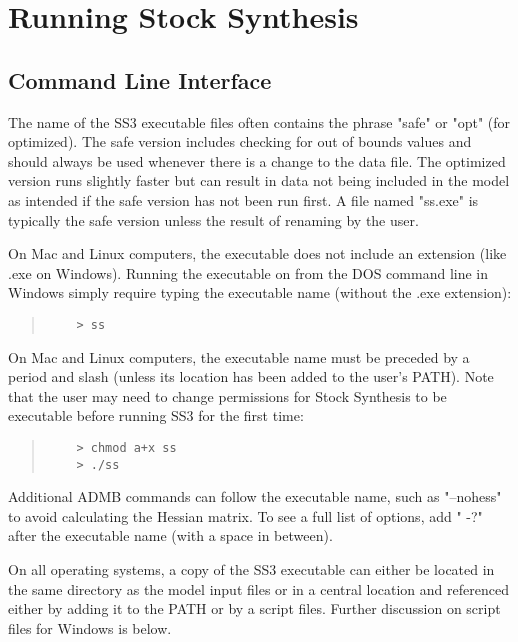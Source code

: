\section{Running Stock Synthesis} \label{sec:RunningSS}

\subsection{Command Line Interface}
The name of the SS3 executable files often contains the phrase "safe" or "opt" (for optimized). The safe version includes checking for out of bounds values and should always be used whenever there is a change to the data file. The optimized version runs slightly faster but can result in data not being included in the model as intended if the safe version has not been run first. A file named "ss.exe" is typically the safe version unless the result of renaming by the user.

On Mac and Linux computers, the executable does not include an extension (like .exe on Windows).
Running the executable on from the DOS command line in Windows simply require typing the executable name (without the .exe extension):
\begin{quote}
	\begin{verbatim}
	> ss
	\end{verbatim}
\end{quote}


On Mac and Linux computers, the executable name must be preceded by a period and slash (unless its location has been added to the user's PATH). Note that the user may need to change permissions for Stock Synthesis to be executable before running SS3 for the first time:

\begin{quote}
	\begin{verbatim}
	> chmod a+x ss
	> ./ss
	\end{verbatim}
\end{quote}

Additional ADMB commands can follow the executable name, such as "–nohess" to avoid calculating the Hessian matrix. To see a full list of options, add " -?" after the executable name (with a space in between).

On all operating systems, a copy of the SS3 executable can either be located in the same directory as the model input files or in a central location and referenced either by adding it to the PATH or by a script files. Further discussion on script files for Windows is below.

